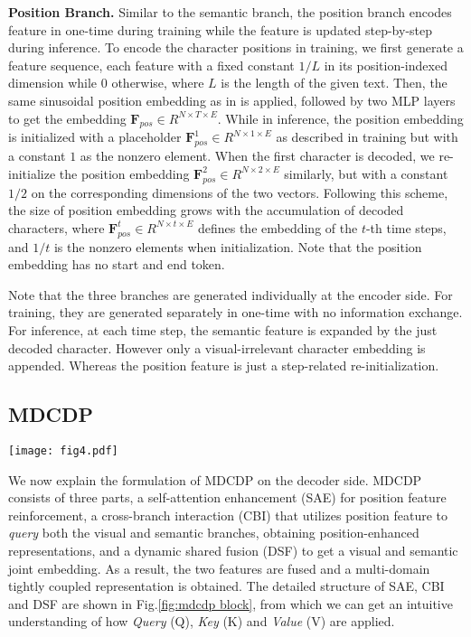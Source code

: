 \noindent\textbf{Position Branch.}
Similar to the semantic branch, the position branch encodes feature in one-time during training while the feature is updated step-by-step during inference. To encode the character positions in training, we first generate a feature sequence, each feature with a fixed constant $1/L$ in its position-indexed dimension while 0 otherwise, where $L$ is the length of the given text. Then, the same sinusoidal position embedding as in \citep{vaswani2017transformer} is applied, followed by two MLP layers to get the embedding $\textbf{F}_{pos}\in R^{N\times T\times E}$. While in inference, the position embedding is initialized with a placeholder $\textbf{F}^1_{pos}\in R^{N\times 1\times E}$ as described in training but with a constant $1$ as the nonzero element. When the first character is decoded, we re-initialize the position embedding $\textbf{F}^2_{pos}\in R^{N\times 2\times E}$ similarly, but with a constant $1/2$ on the corresponding dimensions of the two vectors. Following this scheme, the size of position embedding grows with the accumulation of decoded characters, where $\textbf{F}^t_{pos}\in R^{N\times t \times E}$ defines the embedding of the $t$-th time steps, and $1/t$ is the nonzero elements when initialization. Note that the position embedding has no start and end token.

Note that the three branches are generated individually at the encoder side. For training, they are generated separately in one-time with no information exchange. For inference, at each time step, the semantic feature is expanded by the just decoded character. However only a visual-irrelevant character embedding is appended. Whereas the position feature is just a step-related re-initialization.


\subsection{MDCDP}
\begin{figure*}[t]
\centering
\texttt{[image: fig4.pdf]} \caption{Details of the MDCDP module. (a) Self-Attention Enhancement (SAE), (b) Cross-Branch Interaction (CBI) and (c) Dynamic Shared Fusion (DSF).}
\label{fig:mdcdp block}
\end{figure*}

We now explain the formulation of MDCDP on the decoder side. MDCDP consists of three parts, a self-attention enhancement (SAE) for position feature reinforcement, a cross-branch interaction (CBI) that utilizes position feature to \emph{query} both the visual and semantic branches, obtaining position-enhanced representations, and a dynamic shared fusion (DSF) to get a visual and semantic joint embedding. As a result, the two features are fused and a multi-domain tightly coupled representation is obtained. The detailed structure of SAE, CBI and DSF are shown in Fig.\ref{fig:mdcdp block}, from which we can get an intuitive understanding of how \emph{Query} (Q), \emph{Key} (K) and \emph{Value} (V) are applied.


